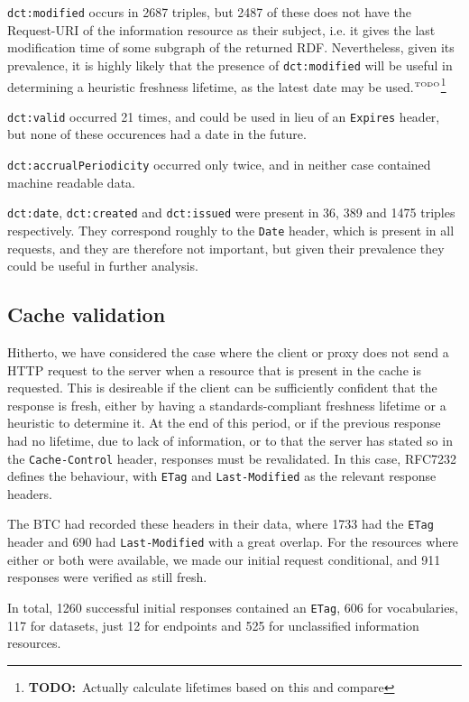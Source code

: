 \documentclass{llncs}
\newcommand{\rdfterm}[1]{\texttt{#1}}
\newcommand{\httph}[1]{\texttt{#1}}
\newcommand{\todo}[1]{\ensuremath{^{\textrm{\tiny{TODO}\normalsize}}}\footnote{\textbf{TODO:}~#1}}
\begin{document}
\rdfterm{dct:modified} occurs in 2687 triples, but 2487 of these does
not have the Request-URI of the information resource as their subject,
i.e. it gives the last modification time of some subgraph of the
returned RDF. Nevertheless, given its prevalence, it is highly likely
that the presence of \rdfterm{dct:modified} will be useful in
determining a heuristic freshness lifetime, as the latest date may be
used.\todo{Actually calculate lifetimes based on this and compare}

\rdfterm{dct:valid} occurred 21 times, and could be used in lieu of an
\httph{Expires} header, but none of these occurences had a date in the
future.

\rdfterm{dct:accrualPeriodicity} occurred only twice, and in neither
case contained machine readable data.

\rdfterm{dct:date}, \rdfterm{dct:created} and \rdfterm{dct:issued}
were present in 36, 389 and 1475 triples respectively. They correspond
roughly to the \httph{Date} header, which is present in all requests,
and they are therefore not important, but given their prevalence they
could be useful in further analysis.

\subsection{Cache validation}

Hitherto, we have considered the case where the client or proxy does
not send a HTTP request to the server when a resource that is present
in the cache is requested. This is desireable if the client can be
sufficiently confident that the response is fresh, either by having a
standards-compliant freshness lifetime or a heuristic to determine
it. At the end of this period, or if the previous response had no
lifetime, due to lack of information, or to that the server has stated
so in the \httph{Cache-Control} header, responses must be
revalidated. In this case, RFC7232 defines the behaviour, with
\httph{ETag} and \httph{Last-Modified} as the relevant response
headers.

The BTC had recorded these headers in their data, where 1733 had the
\httph{ETag} header and 690 had \httph{Last-Modified} with a great
overlap. For the resources where either or both were available, we
made our initial request conditional, and 911 responses were verified
as still fresh. 

In total, 1260 successful initial responses contained
an \httph{ETag}, 606 for vocabularies, 117 for datasets, just 12 for
endpoints and 525 for unclassified information resources.
\end{document}
